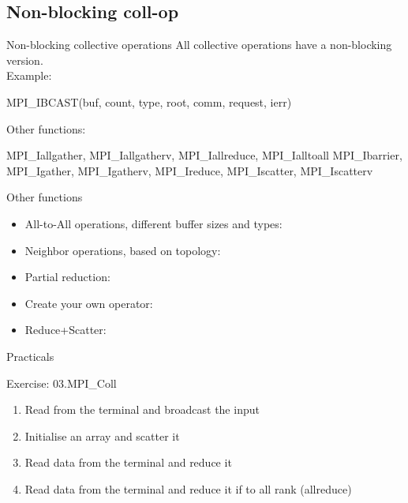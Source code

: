 \documentclass[aspectratio=43]{beamer}
\begin{document}
\subsection{Non-blocking coll-op}
\begin{frame}[fragile]{Non-blocking collective operations}
All collective operations have a non-blocking version.\\
Example:
\begin{Fortranlisting}[]{}
MPI_IBCAST(buf, count, type, root, comm, request, ierr)
\end{Fortranlisting}
Other functions:\\
\begin{Fortranlisting}[]{}
MPI_Iallgather, MPI_Iallgatherv, MPI_Iallreduce, MPI_Ialltoall
MPI_Ibarrier, MPI_Igather, MPI_Igatherv, MPI_Ireduce, MPI_Iscatter, MPI_Iscatterv
\end{Fortranlisting}
\end{frame}

\begin{frame}[fragile]{Other functions}
\begin{itemize}
    \item All-to-All operations, different buffer sizes and types:\\\hspace{1cm}
    \item Neighbor operations, based on topology:\\\hspace{1cm}
    \item Partial reduction:\\\hspace{1cm}
    \item Create your own operator:\\\hspace{1cm}
    \item Reduce+Scatter:\\\hspace{1cm}
\end{itemize}
\end{frame}

\begin{frame}{Practicals}
    \begin{brown2block}{Exercise: 03.MPI\_Coll}
    \begin{enumerate}
        \item Read from the terminal and broadcast the input
        \item Initialise an array and scatter it
        \item Read data from the terminal and reduce it
        \item Read data from the terminal and reduce it if to all rank (allreduce)
    \end{enumerate}
    \end{brown2block}
\end{frame}
\end{document}
